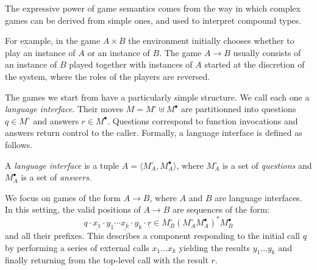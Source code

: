 \documentclass[acmsmall,authordraft]{acmart}
\newcommand{\que}{\circ}
\newcommand{\ans}{\bullet}
\begin{document}
The expressive power of game semantics
comes from the way in which complex games can be derived from simple ones,
and used to interpret compound types.

For example,
in the game $A \times B$
the environment initially chooses whether to play
an instance of $A$ or an instance of $B$.
The game $A \rightarrow B$ usually consists of
an instance of $B$ played
together with instances of $A$
started at the discretion of the system,
where the roles of the players are reversed.

The games we start from have a particularly simple structure.
We call each one a \emph{language interface}.
Their moves $M = M^\que \uplus M^\ans$ are partitionned into
questions $q \in M^\que$ and answers $r \in M^\ans$.
Questions correspond to function invocations
and answers return control to the caller.
Formally,
a language interface is defined as follows.

\begin{definition} \label{def:li}
A \emph{language interface} is a tuple
$A = \langle M_A^\que, M_A^\ans \rangle$, where
$M_A^\que$ is a set of \emph{questions} and
$M_A^\ans$ is a set of \emph{answers}.
\end{definition}

We focus on games of the form $A \rightarrow B$,
where $A$ and $B$ are language interfaces.
In this setting,
the valid positions of $A \rightarrow B$ are
sequences of the form:
\[
  q \cdot \underline{x_1} \cdot y_1 \cdots
          \underline{x_k} \cdot y_k \cdot \underline{r} \in
  M_B^\que ( {M_A^\que} M_A^\ans )^* {M_B^\ans}
\]
and all their prefixes.
This describes a component responding to
the initial call $q$ by
performing a series of external calls $x_1 \ldots x_k$
yielding the results $y_1 \ldots y_k$
and finally returning from the top-level call
with the result $r$.
\end{document}
